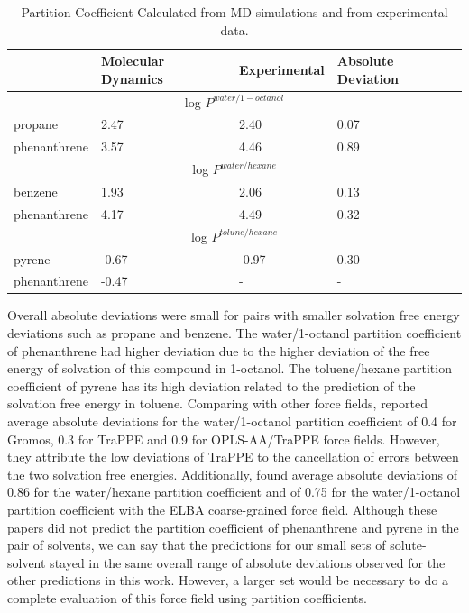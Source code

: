\begin{table}[H]
    \centering
    \caption{Partition Coefficient Calculated from MD simulations and from experimental data.}
    \label{tbl:part}
    \begin{tabular}{llll}
        \hline
        \hline
         & {Molecular Dynamics} & {Experimental}& Absolute Deviation\\
       \hline
       \multicolumn{4}{c}{log $P^{water/1-octanol}$} \\
           \hline
       propane &2.47  &  2.40 & 0.07\\
       phenanthrene &3.57  & 4.46 & 0.89\\
       \hline
       \multicolumn{4}{c}{log $P^{water/hexane}$} \\
           \hline
       benzene &1.93  &  2.06 & 0.13\\
       phenanthrene &4.17  & 4.49 & 0.32 \\
       \hline
       \multicolumn{4}{c}{log $P^{tolune/hexane}$} \\
           \hline 
       pyrene &-0.67  &  -0.97 & 0.30\\
       phenanthrene &-0.47  & - & - \\ 
           \hline    
           \hline 
    \end{tabular}
    
\end{table}

Overall absolute deviations were small for pairs with smaller solvation free energy deviations such as propane and benzene. The water/1-octanol partition coefficient of phenanthrene had higher deviation due to the higher deviation of the free energy of solvation of this compound in 1-octanol. The toluene/hexane partition coefficient of pyrene has its high deviation related to the prediction of the solvation free energy in toluene. Comparing with other force fields,  reported average absolute deviations for the water/1-octanol partition coefficient of 0.4 for Gromos, 0.3 for TraPPE and 0.9 for OPLS-AA/TraPPE force fields. However, they attribute the low deviations of TraPPE to the cancellation of errors between the two solvation free energies. Additionally,  found average absolute deviations of 0.86 for the water/hexane partition coefficient and of 0.75 for the water/1-octanol partition coefficient with the ELBA coarse-grained force field. Although these papers did not predict the partition coefficient of phenanthrene and pyrene in the pair of solvents, we can say that the predictions for our small sets of solute-solvent stayed in the same overall range of absolute deviations observed for the other predictions in this work. However, a larger set would be necessary to do a complete evaluation of this force field using partition coefficients. 